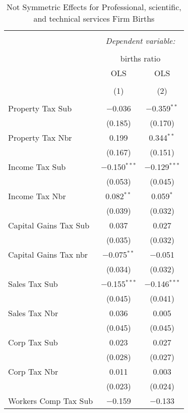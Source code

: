 
\begin{table}[!htbp] \centering 
  \caption{Not Symmetric Effects for  Professional, scientific, and technical services Firm Births} 
  \label{54noequality} 
\footnotesize 
\begin{tabular}{@{\extracolsep{5pt}}lcc} 
\\[-1.8ex]\hline 
\hline \\[-1.8ex] 
 & \multicolumn{2}{c}{\textit{Dependent variable:}} \\ 
\cline{2-3} 
\\[-1.8ex] & \multicolumn{2}{c}{births ratio} \\ 
 & OLS & OLS \\ 
\\[-1.8ex] & (1) & (2)\\ 
\hline \\[-1.8ex] 
 Property Tax Sub & $-$0.036 & $-$0.359$^{**}$ \\ 
  & (0.185) & (0.170) \\ 
  Property Tax Nbr & 0.199 & 0.344$^{**}$ \\ 
  & (0.167) & (0.151) \\ 
  Income Tax Sub & $-$0.150$^{***}$ & $-$0.129$^{***}$ \\ 
  & (0.053) & (0.045) \\ 
  Income Tax Nbr & 0.082$^{**}$ & 0.059$^{*}$ \\ 
  & (0.039) & (0.032) \\ 
  Capital Gains Tax Sub & 0.037 & 0.027 \\ 
  & (0.035) & (0.032) \\ 
  Capital Gains Tax nbr & $-$0.075$^{**}$ & $-$0.051 \\ 
  & (0.034) & (0.032) \\ 
  Sales Tax Sub & $-$0.155$^{***}$ & $-$0.146$^{***}$ \\ 
  & (0.045) & (0.041) \\ 
  Sales Tax Nbr & 0.036 & 0.005 \\ 
  & (0.045) & (0.045) \\ 
  Corp Tax Sub & 0.023 & 0.027 \\ 
  & (0.028) & (0.027) \\ 
  Corp Tax Nbr & 0.011 & 0.003 \\ 
  & (0.023) & (0.024) \\ 
  Workers Comp Tax Sub & $-$0.159 & $-$0.133 \\ 

\end{tabular}
\end{table}

